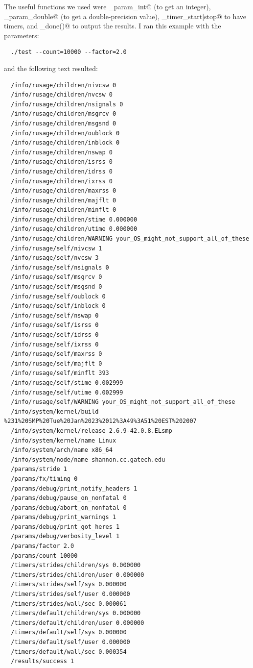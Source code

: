 \documentclass[letter]{report}
\begin{document}
The useful functions we used were \verb@fx_param_int@ (to get an integer), \verb@fx_param_double@ (to get a double-precision value), \verb@fx_timer_{start|stop}@ to have timers, and \verb@fx_done()@ to output the results. I ran this example with the parameters:
\begin{verbatim}
  ./test --count=10000 --factor=2.0
\end{verbatim}
and the following text resulted:
\begin{verbatim}
  /info/rusage/children/nivcsw 0
  /info/rusage/children/nvcsw 0
  /info/rusage/children/nsignals 0
  /info/rusage/children/msgrcv 0
  /info/rusage/children/msgsnd 0
  /info/rusage/children/oublock 0
  /info/rusage/children/inblock 0
  /info/rusage/children/nswap 0
  /info/rusage/children/isrss 0
  /info/rusage/children/idrss 0
  /info/rusage/children/ixrss 0
  /info/rusage/children/maxrss 0
  /info/rusage/children/majflt 0
  /info/rusage/children/minflt 0
  /info/rusage/children/stime 0.000000
  /info/rusage/children/utime 0.000000
  /info/rusage/children/WARNING your_OS_might_not_support_all_of_these
  /info/rusage/self/nivcsw 1
  /info/rusage/self/nvcsw 3
  /info/rusage/self/nsignals 0
  /info/rusage/self/msgrcv 0
  /info/rusage/self/msgsnd 0
  /info/rusage/self/oublock 0
  /info/rusage/self/inblock 0
  /info/rusage/self/nswap 0
  /info/rusage/self/isrss 0
  /info/rusage/self/idrss 0
  /info/rusage/self/ixrss 0
  /info/rusage/self/maxrss 0
  /info/rusage/self/majflt 0
  /info/rusage/self/minflt 393
  /info/rusage/self/stime 0.002999
  /info/rusage/self/utime 0.002999
  /info/rusage/self/WARNING your_OS_might_not_support_all_of_these
  /info/system/kernel/build %231%20SMP%20Tue%20Jan%2023%2012%3A49%3A51%20EST%202007
  /info/system/kernel/release 2.6.9-42.0.8.ELsmp
  /info/system/kernel/name Linux
  /info/system/arch/name x86_64
  /info/system/node/name shannon.cc.gatech.edu
  /params/stride 1
  /params/fx/timing 0
  /params/debug/print_notify_headers 1
  /params/debug/pause_on_nonfatal 0
  /params/debug/abort_on_nonfatal 0
  /params/debug/print_warnings 1
  /params/debug/print_got_heres 1
  /params/debug/verbosity_level 1
  /params/factor 2.0
  /params/count 10000
  /timers/strides/children/sys 0.000000
  /timers/strides/children/user 0.000000
  /timers/strides/self/sys 0.000000
  /timers/strides/self/user 0.000000
  /timers/strides/wall/sec 0.000061
  /timers/default/children/sys 0.000000
  /timers/default/children/user 0.000000
  /timers/default/self/sys 0.000000
  /timers/default/self/user 0.000000
  /timers/default/wall/sec 0.000354
  /results/success 1
\end{verbatim}
\end{document}
